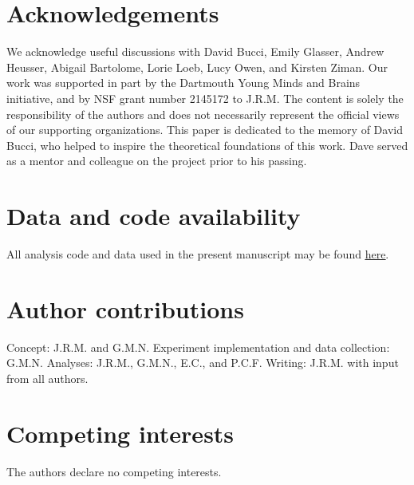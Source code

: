 \documentclass[10pt]{article}
\providecommand{\DIFaddbegin}{} %
\providecommand{\DIFaddend}{} %
\providecommand{\DIFdelbegin}{} %
\providecommand{\DIFdelend}{} %
\newcommand{\DIFscaledelfig}{0.5}
\newlength{\DIFdelgraphicswidth} %
\newlength{\DIFdelgraphicsheight} %
\newcommand{\DIFaddincludegraphics}[2][]{{\color{blue}\fbox{\DIFOincludegraphics[#1]{#2}}}} %
\newcommand{\DIFdelincludegraphics}[2][]{%
\sbox{\DIFdelgraphicsbox}{\DIFOincludegraphics[#1]{#2}}%
\settoboxwidth{\DIFdelgraphicswidth}{\DIFdelgraphicsbox} %
\settoboxtotalheight{\DIFdelgraphicsheight}{\DIFdelgraphicsbox} %
\scalebox{\DIFscaledelfig}{%
\parbox[b]{\DIFdelgraphicswidth}{\usebox{\DIFdelgraphicsbox}\\[-\baselineskip] \rule{\DIFdelgraphicswidth}{0em}}\llap{\resizebox{\DIFdelgraphicswidth}{\DIFdelgraphicsheight}{%
\setlength{\unitlength}{\DIFdelgraphicswidth}%
\begin{picture}(1,1)%
\thicklines\linethickness{2pt} %
{\color[rgb]{1,0,0}\put(0,0){\framebox(1,1){}}}%
{\color[rgb]{1,0,0}\put(0,0){\line( 1,1){1}}}%
{\color[rgb]{1,0,0}\put(0,1){\line(1,-1){1}}}%
\end{picture}%
}\hspace*{3pt}}} %
} %
\DeclareRobustCommand{\DIFaddbegin}{\DIFOaddbegin \let\includegraphics\DIFaddincludegraphics} %
\DeclareRobustCommand{\DIFaddend}{\DIFOaddend \let\includegraphics\DIFOincludegraphics} %
\DeclareRobustCommand{\DIFdelbegin}{\DIFOdelbegin \let\includegraphics\DIFdelincludegraphics} %
\DeclareRobustCommand{\DIFdelend}{\DIFOaddend \let\includegraphics\DIFOincludegraphics} %
\begin{document}
   


\section*{Acknowledgements}
We acknowledge useful discussions with David Bucci, Emily Glasser,
Andrew Heusser, Abigail Bartolome, Lorie Loeb, Lucy Owen, and Kirsten
Ziman.  Our work was supported in part by the Dartmouth Young Minds
and Brains initiative, and by NSF grant number 2145172 to J.R.M.  The
content is solely the responsibility of the authors and does not
necessarily represent the official views of our supporting
organizations.  This paper is dedicated to the memory of David Bucci,
who helped to inspire the theoretical foundations of this work.  Dave
served as a mentor and colleague on the project prior to his passing.


\section*{Data and code availability}
All analysis code and data used in the present manuscript may be found
\href{https://github.com/ContextLab/brainfit-paper}{\underline{here}}.

\section*{Author contributions}
Concept: J.R.M. and G.M.N.  Experiment implementation and data collection: G.M.N.
Analyses: J.R.M., G.M.N., E.C., and P.C.F.  Writing: J.R.M. with input
from all authors.

\section*{Competing interests}
The authors declare no competing interests.


\DIFdelbegin %
\DIFdelend \DIFaddbegin 
 \DIFaddend
\end{document}
